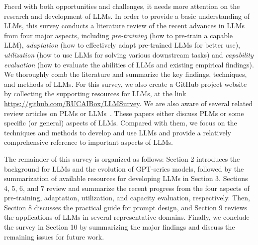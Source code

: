 Faced with both opportunities and challenges, it needs more  attention on the research and development of LLMs. 
In order to provide a basic understanding of LLMs,  
this survey conducts a literature review of the recent advances in LLMs 
from four major aspects, including \emph{pre-training} (how to pre-train a capable LLM), \emph{adaptation} (how to effectively adapt pre-trained LLMs for better use), \emph{utilization} (how to use LLMs for solving various downstream tasks) and   
\emph{capability evaluation} (how to evaluate the abilities of LLMs and existing empirical findings).  
We thoroughly comb the literature and summarize the key findings, techniques, and methods of LLMs.  
For this survey, we also 
create a GitHub project website by collecting the supporting resources for LLMs, at the link \url{https://github.com/RUCAIBox/LLMSurvey}.  
We are also aware of several related review articles on PLMs or LLMs~\cite{Han-AIopen-2021-PTM,qiu-CoRR-2020-PTM,Li-IJCAI-2021-Pretrained,Liu-survey-2023-Pre-train,Lu-arxiv-2022-Survey,Dong-arxiv-2023-A,Shanahan-arxiv-2022-Talking,Huang-arxiv-2022-Towards,Qiao-arxiv-2022-Reasoning,Cao-arxiv-2023-comprehensive,Zhou-FITEE-2023-ChatGPT,Zhao-arxiv-2022-Dense}. These papers either  discuss PLMs or some specific (or general) aspects of LLMs. 
Compared with them, we focus on the techniques and methods to develop and use LLMs and provide a relatively comprehensive reference to important aspects  of LLMs. 


The remainder of this survey is organized as follows: Section 2 introduces the background for LLMs and the evolution of GPT-series models, followed by the summarization of available resources for developing LLMs in Section 3. Sections 4, 5, 6, and 7 review and summarize the recent progress from the four aspects of pre-training, adaptation, utilization, and capacity evaluation, respectively. 
Then, Section 8 discusses the practical guide for prompt design, and Section 9 reviews the applications of LLMs in several representative domains. 
Finally, we conclude the survey in Section 10 by summarizing the major findings and discuss the remaining issues for future work. 

